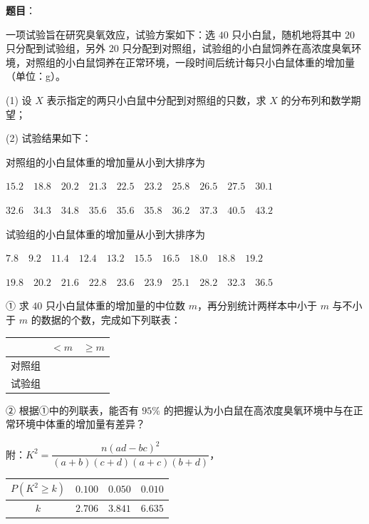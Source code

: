 \begin{answer}

\textbf{题目}：

一项试验旨在研究臭氧效应，试验方案如下：选 $40$ 只小白鼠，随机地将其中 $20$ 只分配到试验组，另外 $20$ 只分配到对照组，试验组的小白鼠饲养在高浓度臭氧环境，对照组的小白鼠饲养在正常环境，一段时间后统计每只小白鼠体重的增加量（单位：g）。

  (1) 设 $X$ 表示指定的两只小白鼠中分配到对照组的只数，求 $X$ 的分布列和数学期望；

  (2) 试验结果如下：

对照组的小白鼠体重的增加量从小到大排序为

$15.2\quad18.8\quad20.2\quad21.3\quad22.5\quad23.2\quad25.8\quad26.5\quad27.5\quad30.1$

$32.6\quad34.3\quad34.8\quad35.6\quad35.6\quad35.8\quad36.2\quad37.3\quad40.5\quad43.2$

试验组的小白鼠体重的增加量从小到大排序为

$7.8\quad9.2\quad11.4\quad12.4\quad13.2\quad15.5\quad16.5\quad18.0\quad18.8\quad19.2$

$19.8\quad20.2\quad21.6\quad22.8\quad23.6\quad23.9\quad25.1\quad28.2\quad32.3\quad36.5$

① 求 $40$ 只小白鼠体重的增加量的中位数 $m$，再分别统计两样本中小于 $m$ 与不小于 $m$ 的数据的个数，完成如下列联表：

\begin{center}
\begin{tabular}{ccc}
\toprule
 & $<m$ & $\geqslant m$ \\
\midrule
对照组 &  &  \\
试验组 &  &  \\
\bottomrule
\end{tabular}
\end{center}

② 根据①中的列联表，能否有 $95\%$ 的把握认为小白鼠在高浓度臭氧环境中与在正常环境中体重的增加量有差异？

附：$K^2=\dfrac{n(ad-bc)^2}{(a+b)(c+d)(a+c)(b+d)}$，

\begin{center}
\begin{tabular}{cccc}
\toprule
$P(K^2\geqslant k)$ & $0.100$ & $0.050$ & $0.010$ \\
\midrule
$k$ & $2.706$ & $3.841$ & $6.635$ \\
\bottomrule
\end{tabular}
\end{center}


\end{answer}
